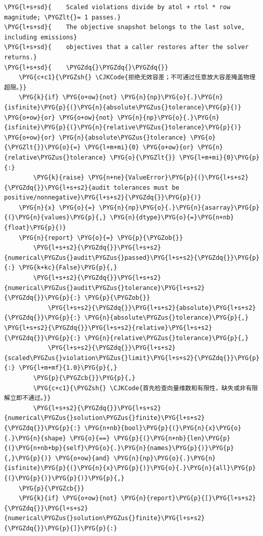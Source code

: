 \begin{Verbatim}
\PYG{l+s+sd}{    Scaled violations divide by atol + rtol * row magnitude; \PYGZlt{}= 1 passes.}
\PYG{l+s+sd}{    The objective snapshot belongs to the last solve, including emissions}
\PYG{l+s+sd}{    objectives that a caller restores after the solver returns.}
\PYG{l+s+sd}{    \PYGZdq{}\PYGZdq{}\PYGZdq{}}
    \PYG{c+c1}{\PYGZsh{} \CJKCode{拒绝无效容差；不可通过任意放大容差掩盖物理超限。}}
    \PYG{k}{if} \PYG{o+ow}{not} \PYG{n}{np}\PYG{o}{.}\PYG{n}{isfinite}\PYG{p}{(}\PYG{n}{absolute\PYGZus{}tolerance}\PYG{p}{)} \PYG{o+ow}{or} \PYG{o+ow}{not} \PYG{n}{np}\PYG{o}{.}\PYG{n}{isfinite}\PYG{p}{(}\PYG{n}{relative\PYGZus{}tolerance}\PYG{p}{)} \PYG{o+ow}{or} \PYG{n}{absolute\PYGZus{}tolerance} \PYG{o}{\PYGZlt{}}\PYG{o}{=} \PYG{l+m+mi}{0} \PYG{o+ow}{or} \PYG{n}{relative\PYGZus{}tolerance} \PYG{o}{\PYGZlt{}} \PYG{l+m+mi}{0}\PYG{p}{:}
        \PYG{k}{raise} \PYG{n+ne}{ValueError}\PYG{p}{(}\PYG{l+s+s2}{\PYGZdq{}}\PYG{l+s+s2}{audit tolerances must be positive/nonnegative}\PYG{l+s+s2}{\PYGZdq{}}\PYG{p}{)}
    \PYG{n}{x} \PYG{o}{=} \PYG{n}{np}\PYG{o}{.}\PYG{n}{asarray}\PYG{p}{(}\PYG{n}{values}\PYG{p}{,} \PYG{n}{dtype}\PYG{o}{=}\PYG{n+nb}{float}\PYG{p}{)}
    \PYG{n}{report} \PYG{o}{=} \PYG{p}{\PYGZob{}}
        \PYG{l+s+s2}{\PYGZdq{}}\PYG{l+s+s2}{numerical\PYGZus{}audit\PYGZus{}passed}\PYG{l+s+s2}{\PYGZdq{}}\PYG{p}{:} \PYG{k+kc}{False}\PYG{p}{,}
        \PYG{l+s+s2}{\PYGZdq{}}\PYG{l+s+s2}{numerical\PYGZus{}audit\PYGZus{}tolerance}\PYG{l+s+s2}{\PYGZdq{}}\PYG{p}{:} \PYG{p}{\PYGZob{}}
            \PYG{l+s+s2}{\PYGZdq{}}\PYG{l+s+s2}{absolute}\PYG{l+s+s2}{\PYGZdq{}}\PYG{p}{:} \PYG{n}{absolute\PYGZus{}tolerance}\PYG{p}{,} \PYG{l+s+s2}{\PYGZdq{}}\PYG{l+s+s2}{relative}\PYG{l+s+s2}{\PYGZdq{}}\PYG{p}{:} \PYG{n}{relative\PYGZus{}tolerance}\PYG{p}{,}
            \PYG{l+s+s2}{\PYGZdq{}}\PYG{l+s+s2}{scaled\PYGZus{}violation\PYGZus{}limit}\PYG{l+s+s2}{\PYGZdq{}}\PYG{p}{:} \PYG{l+m+mf}{1.0}\PYG{p}{,}
        \PYG{p}{\PYGZcb{}}\PYG{p}{,}
        \PYG{c+c1}{\PYGZsh{} \CJKCode{首先检查向量维数和有限性，缺失或非有限解立即不通过。}}
        \PYG{l+s+s2}{\PYGZdq{}}\PYG{l+s+s2}{numerical\PYGZus{}solution\PYGZus{}finite}\PYG{l+s+s2}{\PYGZdq{}}\PYG{p}{:} \PYG{n+nb}{bool}\PYG{p}{(}\PYG{n}{x}\PYG{o}{.}\PYG{n}{shape} \PYG{o}{==} \PYG{p}{(}\PYG{n+nb}{len}\PYG{p}{(}\PYG{n+nb+bp}{self}\PYG{o}{.}\PYG{n}{names}\PYG{p}{)}\PYG{p}{,}\PYG{p}{)} \PYG{o+ow}{and} \PYG{n}{np}\PYG{o}{.}\PYG{n}{isfinite}\PYG{p}{(}\PYG{n}{x}\PYG{p}{)}\PYG{o}{.}\PYG{n}{all}\PYG{p}{(}\PYG{p}{)}\PYG{p}{)}\PYG{p}{,}
    \PYG{p}{\PYGZcb{}}
    \PYG{k}{if} \PYG{o+ow}{not} \PYG{n}{report}\PYG{p}{[}\PYG{l+s+s2}{\PYGZdq{}}\PYG{l+s+s2}{numerical\PYGZus{}solution\PYGZus{}finite}\PYG{l+s+s2}{\PYGZdq{}}\PYG{p}{]}\PYG{p}{:}

\end{Verbatim}
